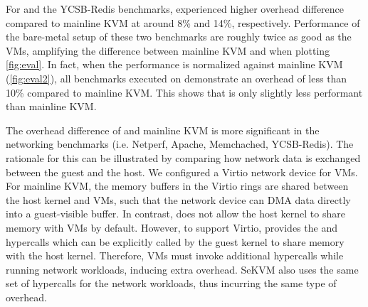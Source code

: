 For  and the YCSB-Redis benchmarks, \rustsec{} experienced higher
overhead difference compared to mainline KVM at around 8\% and 14\%,
respectively.
Performance of the bare-metal setup of these two benchmarks
are roughly twice as good as the VMs, amplifying the difference between mainline
KVM and \rustsec{} when plotting \autoref{fig:eval}.
In fact, when the performance is normalized against
mainline KVM (\autoref{fig:eval2}), all benchmarks executed on \rustsec{}
demonstrate an overhead of less than 10\% compared to mainline KVM.
This shows that \rustsec{} is only slightly less performant than mainline KVM.

The overhead difference of \rustsec{} and mainline KVM is more significant in
the networking benchmarks (i.e. Netperf, Apache, Memchached, YCSB-Redis).
The rationale for this can be illustrated by comparing how network data is
exchanged between the guest and the host.
We configured a Virtio network device for VMs. For mainline KVM, the memory
buffers in the Virtio rings are shared between the host kernel and VMs, such
that the network device can DMA data directly into a guest-visible buffer.
In contrast, \rustsec{} does not allow the host kernel to share memory with VMs
by default. However, to support Virtio, \rustsec{} provides the
 and  hypercalls which can be explicitly
called by the guest kernel to share memory with the host kernel.
Therefore, \rustsec{} VMs must invoke additional hypercalls while running
network workloads, inducing extra overhead. SeKVM also uses the same set of
hypercalls for the network workloads, thus incurring the same type of overhead.



